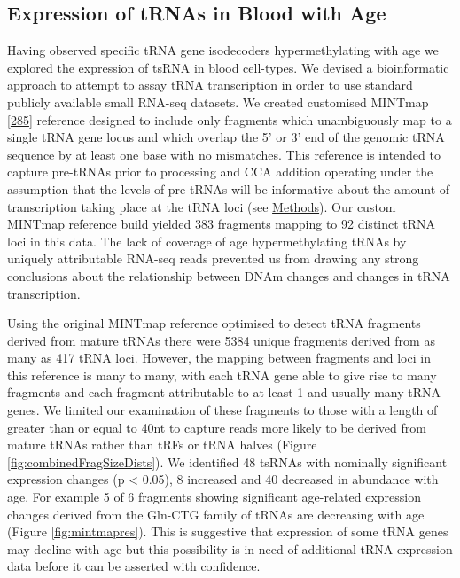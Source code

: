\documentclass[
]{book}
\begin{document}
\hypertarget{expression-of-trnas-in-blood-with-age}{%
\subsection{Expression of tRNAs in Blood with Age}\label{expression-of-trnas-in-blood-with-age}}

Having observed specific tRNA gene isodecoders hypermethylating with age we explored the expression of tsRNA in blood cell-types.
We devised a bioinformatic approach to attempt to assay tRNA transcription in order to use standard publicly available small RNA-seq datasets.
We created customised MINTmap {[}\protect\hyperlink{ref-Loher2017}{285}{]} reference designed to include only fragments which unambiguously map to a single tRNA gene locus and which overlap the 5' or 3' end of the genomic tRNA sequence by at least one base with no mismatches.
This reference is intended to capture pre-tRNAs prior to processing and CCA addition operating under the assumption that the levels of pre-tRNAs will be informative about the amount of transcription taking place at the tRNA loci (see \protect\hyperlink{mintmapmethods}{Methods}).
Our custom MINTmap reference build yielded 383 fragments mapping to 92 distinct tRNA loci in this data.
The lack of coverage of age hypermethylating tRNAs by uniquely attributable RNA-seq reads prevented us from drawing any strong conclusions about the relationship between DNAm changes and changes in tRNA transcription.

Using the original MINTmap reference optimised to detect tRNA fragments derived from mature tRNAs there were 5384 unique fragments derived from as many as 417 tRNA loci.
However, the mapping between fragments and loci in this reference is many to many, with each tRNA gene able to give rise to many fragments and each fragment attributable to at least 1 and usually many tRNA genes.
We limited our examination of these fragments to those with a length of greater than or equal to 40nt to capture reads more likely to be derived from mature tRNAs rather than tRFs or tRNA halves (Figure \ref{fig:combinedFragSizeDists}).
We identified 48 tsRNAs with nominally significant expression changes (p \textless{} 0.05), 8 increased and 40 decreased in abundance with age.
For example 5 of 6 fragments showing significant age-related expression changes derived from the Gln-CTG family of tRNAs are decreasing with age (Figure \ref{fig:mintmapres}).
This is suggestive that expression of some tRNA genes may decline with age but this possibility is in need of additional tRNA expression data before it can be asserted with confidence.
\end{document}
